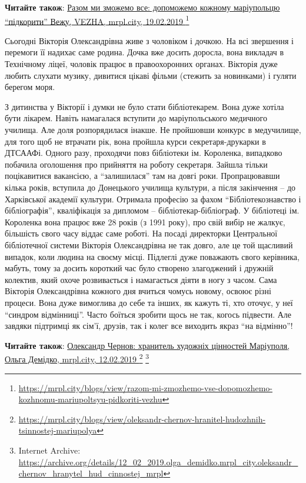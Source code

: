 \textbf{Читайте також}: \href{https://mrpl.city/blogs/view/razom-mi-zmozhemo-vse-dopomozhemo-kozhnomu-mariupoltsyu-pidkoriti-vezhu}{%
Разом ми зможемо все: допоможемо кожному маріупольцю \enquote{підкорити} Вежу, %
VEZHA, mrpl.city, 19.02.2019%
}
\footnote{\url{https://mrpl.city/blogs/view/razom-mi-zmozhemo-vse-dopomozhemo-kozhnomu-mariupoltsyu-pidkoriti-vezhu}}

Сьогодні Вікторія Олександрівна живе з чоловіком і дочкою. На всі звершення і
перемоги її надихає саме родина. Дочка вже досить доросла, вона викладач в
Технічному ліцеї, чоловік працює в правоохоронних органах. Вікторія дуже любить
слухати музику, дивитися цікаві фільми (стежить за новинками) і гуляти берегом
моря.

З дитинства у Вікторії і думки не було стати бібліотекарем. Вона дуже хотіла
бути лікарем. Навіть намагалася вступити до маріупольського медичного училища.
Але доля розпорядилася інакше. Не пройшовши конкурс в медучилище, для того щоб
не втрачати рік, вона пройшла курси секретаря-друкарки в ДТСААФі. Одного разу,
проходячи повз бібліотеки ім. Короленка, випадково побачила оголошення про
прийняття на роботу секретаря. Зайшла тільки поцікавитися вакансією, а
\enquote{залишилася} там на довгі роки. Пропрацювавши кілька років, вступила до
Донецького училища культури, а після закінчення – до Харківської академії
культури. Отримала професію за фахом \enquote{Бібліотекознавство і бібліографія},
кваліфікація за дипломом – бібліотекар-бібліограф. У бібліотеці ім. Короленка
вона працює вже 28 років (з 1991 року), про свій вибір не жалкує, більшість
свого часу віддає саме роботі. На посаді директорки Центральної бібліотечної
системи Вікторія Олександрівна не так довго, але це той щасливий випадок, коли
людина на своєму місці. Підлеглі дуже поважають свого керівника, мабуть, тому
за досить короткий час було створено злагоджений і дружній колектив, який охоче
розвивається і намагається діяти в ногу з часом. Сама Вікторія Олександрівна
кожного дня вчиться чомусь новому, освоює різні процеси. Вона дуже вимоглива до
себе та інших, як кажуть ті, хто оточує, у неї \enquote{синдром відмінниці}. Часто
боїться зробити щось не так, когось підвести. Але завдяки підтримці як сім'ї,
друзів, так і колег все виходить якраз \enquote{на відмінно}!

\textbf{Читайте також}: \href{https://mrpl.city/blogs/view/oleksandr-chernov-hranitel-hudozhnih-tsinnostej-mariupolya}{%
Олександр Чернов: хранитель художніх цінностей Маріуполя, %
Ольга Демідко, mrpl.city, 12.02.2019%
}
\footnote{\url{https://mrpl.city/blogs/view/oleksandr-chernov-hranitel-hudozhnih-tsinnostej-mariupolya}} %
\footnote{Internet Archive: \url{https://archive.org/details/12_02_2019.olga_demidko.mrpl_city.oleksandr_chernov_hranytel_hud_cinnostej_mrpl}}

